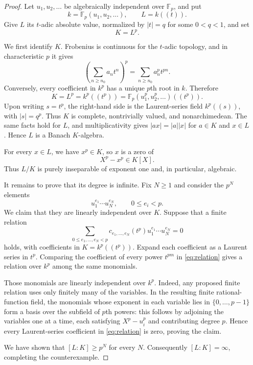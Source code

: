 \documentclass[11pt]{article}
\newcommand{\Fp}{\mathbb F_p}
\begin{document}
\begin{proof}
Let $u_1,u_2,\ldots$ be algebraically independent over $\Fp$, and put
\[
k=\Fp(u_1,u_2,\ldots),\qquad L=k((t)).
\]
Give $L$ its $t$-adic absolute value, normalized by $|t|=q$ for some
$0<q<1$, and set
\[
K=L^p.
\]

We first identify $K$.  Frobenius is continuous for the $t$-adic topology,
and in characteristic $p$ it gives
\[
\left(\sum_{n\ge n_0}a_nt^n\right)^p
   =\sum_{n\ge n_0}a_n^p t^{pn}.
\]
Conversely, every coefficient in $k^p$ has a unique $p$th root in $k$.
Therefore
\begin{equation}\label{eq:frobenius-image}
K=L^p=k^p((t^p))
 =\Fp(u_1^p,u_2^p,\ldots)((t^p)).
\end{equation}
Upon writing $s=t^p$, the right-hand side is the Laurent-series field
$k^p((s))$, with $|s|=q^p$.  Thus $K$ is complete, nontrivially valued, and
nonarchimedean.  The same facts hold for $L$, and multiplicativity gives
$|ax|=|a||x|$ for $a\in K$ and $x\in L$.  Hence $L$ is a Banach
$K$-algebra.

For every $x\in L$, we have $x^p\in K$, so $x$ is a zero of
\[
X^p-x^p\in K[X].
\]
Thus $L/K$ is purely inseparable of exponent one and, in particular,
algebraic.

It remains to prove that its degree is infinite.  Fix $N\ge1$ and consider
the $p^N$ elements
\[
u_1^{e_1}\cdots u_N^{e_N},
\qquad 0\le e_i<p.
\]
We claim that they are linearly independent over $K$.  Suppose that a finite
relation
\begin{equation}\label{eq:relation}
\sum_{0\le e_1,\ldots,e_N<p}
c_{e_1,\ldots,e_N}(t^p)u_1^{e_1}\cdots u_N^{e_N}=0
\end{equation}
holds, with coefficients in $K=k^p((t^p))$.  Expand each coefficient as a
Laurent series in $t^p$.  Comparing the coefficient of every power $t^{pm}$
in \eqref{eq:relation} gives a relation over $k^p$ among the same monomials.

Those monomials are linearly independent over $k^p$.  Indeed, any proposed
finite relation uses only finitely many of the variables.  In the resulting
finite rational-function field, the monomials whose exponent in each variable
lies in $\{0,\ldots,p-1\}$ form a basis over the subfield of $p$th powers:
this follows by adjoining the variables one at a time, each satisfying
$X^p-u_i^p$ and contributing degree $p$.  Hence every Laurent-series
coefficient in \eqref{eq:relation} is zero, proving the claim.

We have shown that $[L:K]\ge p^N$ for every $N$.  Consequently
$[L:K]=\infty$, completing the counterexample.
\end{proof}
\end{document}
